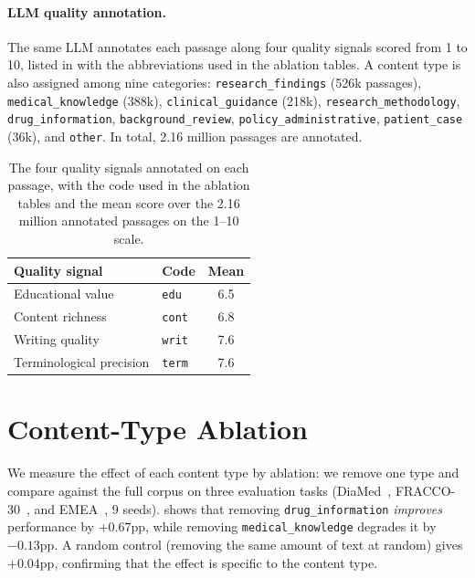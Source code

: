 \paragraph{LLM quality annotation.} The same LLM annotates each passage along four quality signals scored from 1 to 10, listed in  with the abbreviations used in the ablation tables. A content type is also assigned among nine categories: \texttt{research\_\allowbreak findings} (526k passages), \texttt{medical\_\allowbreak knowledge} (388k), \texttt{clinical\_\allowbreak guidance} (218k), \texttt{research\_\allowbreak methodology}, \texttt{drug\_\allowbreak information}, \texttt{background\_\allowbreak review}, \texttt{policy\_\allowbreak administrative}, \texttt{patient\_\allowbreak case} (36k), and \texttt{other}. In total, 2.16 million passages are annotated.


\begin{table}[t]
\centering
\small
\setlength{\tabcolsep}{8pt}
\begin{tabular}{llc}
\toprule
\textbf{Quality signal} & \textbf{Code} & \textbf{Mean} \\
\midrule
Educational value & \texttt{edu} & 6.5 \\
Content richness & \texttt{cont} & 6.8 \\
Writing quality & \texttt{writ} & 7.6 \\
Terminological precision & \texttt{term} & 7.6 \\
\bottomrule
\end{tabular}
\caption{The four quality signals annotated on each passage, with the code used in the ablation tables and the mean score over the 2.16 million annotated passages on the 1--10 scale.}
\label{tab:quality-signals}
\end{table}


\section{Content-Type Ablation}

\begin{reviewread}
We measure the effect of each content type by ablation: we remove one type and compare against the full corpus on three evaluation tasks (DiaMed~\citep{drbenchmark2024}, FRACCO-30~\citep{pignat2024fracco}, and EMEA~\citep{neveol14quaero}, 9 seeds).  shows that removing \texttt{drug\_information} \emph{improves} performance by $+0.67$pp, while removing \texttt{medical\_knowledge} degrades it by $-0.13$pp. A random control (removing the same amount of text at random) gives $+0.04$pp, confirming that the effect is specific to the content type.
\end{reviewread}

